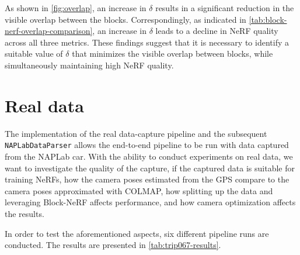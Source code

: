 


As shown in \autoref{fig:overlap}, an increase in $\delta$ results in a significant reduction in the visible overlap between the blocks. Correspondingly, as indicated in \autoref{tab:block-nerf-overlap-comparison}, an increase in $\delta$ leads to a decline in NeRF quality across all three metrics. These findings suggest that it is necessary to identify a suitable value of $\delta$ that minimizes the visible overlap between blocks, while simultaneously maintaining high NeRF quality.
















\section{Real data}
The implementation of the real data-capture pipeline and the subsequent \texttt{NAPLabDataParser} allows the end-to-end pipeline to be run with data captured from the NAPLab car. With the ability to conduct experiments on real data, we want to investigate the quality of the capture, if the captured data is suitable for training NeRFs, how the camera poses estimated from the GPS compare to the camera poses approximated with COLMAP, how splitting up the data and leveraging Block-NeRF affects performance, and how camera optimization affects the results.

In order to test the aforementioned aspects, six different pipeline runs are conducted. The results are presented in \autoref{tab:trip067-results}.


